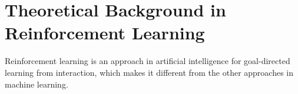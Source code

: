 \section{Theoretical Background in Reinforcement Learning}
Reinforcement learning is an approach in artificial intelligence for goal-directed learning from interaction, which makes it different from the other approaches in machine learning.